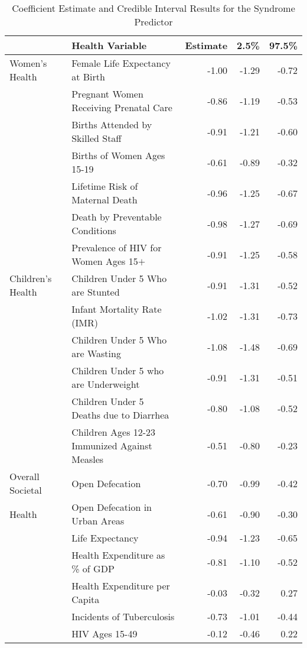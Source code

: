 \begin{table}[htb]
\renewcommand\thetable{3.1}
       \footnotesize
    \centering
        \caption{Coefficient Estimate and Credible Interval Results for the Syndrome Predictor}
    \begin{tabular}{l|l|r|r|r}
    & \textbf{Health Variable} & \textbf{Estimate} & \textbf{2.5\%} & \textbf{97.5\%} \\
    \hline
    \hline
    Women's Health & Female Life Expectancy at Birth &  -1.00 & -1.29 & -0.72 \\ 
     & Pregnant Women Receiving Prenatal Care & -0.86 & -1.19 & -0.53 \\ 
     & Births Attended by Skilled Staff  & -0.91 & -1.21 & -0.60 \\ 
     & Births of Women Ages 15-19  & -0.61 & -0.89 & -0.32 \\ 
     & Lifetime Risk of Maternal Death  & -0.96 & -1.25 & -0.67 \\
     & Death by Preventable Conditions  & -0.98 & -1.27 & -0.69 \\ 
     & Prevalence of HIV for Women Ages 15$+$  &  -0.91 & -1.25 & -0.58 \\
     \hline
     Children's Health & Children Under 5 Who are Stunted  &  -0.91 & -1.31 & -0.52 \\
     & Infant Mortality Rate (IMR)  & -1.02 & -1.31 & -0.73 \\  
     & Children Under 5 Who are Wasting  & -1.08 & -1.48 & -0.69 \\
     & Children Under 5 who are Underweight  &  -0.91 & -1.31 & -0.51 \\ 
     & Children Under 5 Deaths due to Diarrhea  & -0.80 & -1.08 & -0.52 \\
     & Children Ages 12-23 Immunized Against Measles  &  -0.51 & -0.80 & -0.23 \\
     \hline
     Overall Societal & Open Defecation  &  -0.70 & -0.99 & -0.42 \\ 
     Health & Open Defecation in Urban Areas  & -0.61 & -0.90 & -0.30 \\  
     & Life Expectancy  & -0.94 & -1.23 & -0.65 \\
     & Health Expenditure as \% of GDP & -0.81 & -1.10 & -0.52 \\ 
     & Health Expenditure per Capita  & -0.03 & -0.32 & 0.27 \\
     & Incidents of Tuberculosis  & -0.73 & -1.01 & -0.44 \\
     & HIV Ages 15-49  & -0.12 & -0.46 & 0.22 \\ 

\end{tabular}
\end{table}
